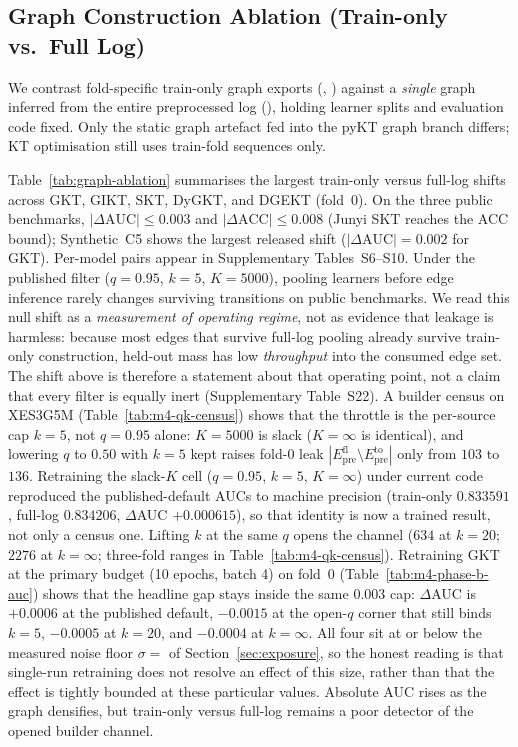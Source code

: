 \documentclass[preprint,10pt,doubleblind]{elsarticle}
\begin{document}
\subsection{Graph Construction Ablation (Train-only vs.\ Full Log)}
\label{sec:exp-graph-ablation}
We contrast fold-specific train-only graph exports
(, ) against a
\emph{single} graph inferred from the entire preprocessed log
(), holding learner splits and
evaluation code fixed. Only the static graph artefact fed into the pyKT graph
branch differs; KT optimisation still uses train-fold sequences only.


Table~\ref{tab:graph-ablation} summarises the largest train-only versus
full-log shifts across GKT, GIKT, SKT, DyGKT, and DGEKT (fold~0).
On the three public benchmarks, $|\Delta\text{AUC}|{\leq}0.003$ and
$|\Delta\text{ACC}|{\leq}0.008$ (Junyi SKT reaches the ACC bound);
Synthetic~C5 shows the largest released shift
($|\Delta\text{AUC}|{=}0.002$ for GKT). Per-model pairs appear in
Supplementary Tables~S6--S10. Under the published filter
($q{=}0.95$, $k{=}5$, $K{=}5000$), pooling learners before edge inference
rarely changes surviving transitions on public benchmarks. We read this null
shift as a \emph{measurement of operating regime}, not as evidence that
leakage is harmless: because most edges that survive full-log pooling already
survive train-only construction, held-out mass has low \emph{throughput} into
the consumed edge set. The shift above is therefore a statement about that
operating point, not a claim that every filter is equally inert
(Supplementary Table~S22).
A builder census on XES3G5M (Table~\ref{tab:m4-qk-census}) shows that the
throttle is the per-source cap $k{=}5$, not $q{=}0.95$ alone: $K{=}5000$ is
slack ($K{=}\infty$ is identical), and lowering $q$ to $0.50$ with $k{=}5$ kept
raises fold-0 leak $|E_{\mathrm{pre}}^{\mathrm{fl}}\setminus E_{\mathrm{pre}}^{\mathrm{to}}|$
only from $103$ to $136$. Retraining the slack-$K$ cell
($q{=}0.95$, $k{=}5$, $K{=}\infty$) under current code reproduced the
published-default AUCs to machine precision (train-only $0.833591$, full-log
$0.834206$, $\Delta$AUC ${+}0.000615$), so that identity is now a trained
result, not only a census one. Lifting $k$ at the same $q$ opens the channel
($634$ at $k{=}20$; $2276$ at $k{=}\infty$; three-fold ranges in
Table~\ref{tab:m4-qk-census}).
Retraining GKT at the primary budget (10 epochs, batch 4) on fold~0
(Table~\ref{tab:m4-phase-b-auc}) shows that the headline gap stays inside
the same $0.003$ cap: $\Delta$AUC is ${+}0.0006$ at the published default,
${-}0.0015$ at the open-$q$ corner that still binds $k{=}5$, ${-}0.0005$
at $k{=}20$, and ${-}0.0004$ at $k{=}\infty$. All four sit at or below the
measured noise floor $\sigma{=}$\NoiseFloorPrimaryMeas{} of
Section~\ref{sec:exposure}, so the honest reading is that single-run
retraining does not resolve an effect of this size, rather than that the
effect is tightly bounded at these particular values. Absolute AUC rises as
the graph densifies, but train-only versus full-log remains a poor detector
of the opened builder channel.
\end{document}
